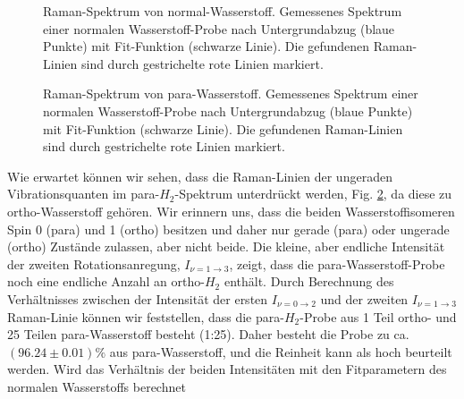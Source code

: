 \documentclass[11pt]{article}
\begin{document}
\begin{figure}[htbp]
	\centering
   \caption{\small Raman-Spektrum von normal-Wasserstoff. Gemessenes Spektrum einer normalen Wasserstoff-Probe nach Untergrundabzug (blaue Punkte) mit Fit-Funktion (schwarze Linie). Die gefundenen Raman-Linien sind durch gestrichelte rote Linien markiert.}
   \label{fig:normal_H2}
\end{figure}

\begin{figure}[htbp]
	\centering
   \caption{\small Raman-Spektrum von para-Wasserstoff. Gemessenes Spektrum einer normalen Wasserstoff-Probe nach Untergrundabzug (blaue Punkte) mit Fit-Funktion (schwarze Linie). Die gefundenen Raman-Linien sind durch gestrichelte rote Linien markiert.}
   \label{fig:para_H2}
\end{figure}

Wie erwartet können wir sehen, dass die Raman-Linien der ungeraden Vibrationsquanten im para-$H_2$-Spektrum unterdrückt werden, Fig. \ref{fig:para_H2}, da diese zu ortho-Wasserstoff gehören. Wir erinnern uns, dass die beiden Wasserstoffisomeren Spin 0 (para) und 1 (ortho) besitzen und daher nur gerade (para) oder ungerade (ortho) Zustände zulassen, aber nicht beide. Die kleine, aber endliche Intensität der zweiten Rotationsanregung, $I_{\nu  = 1 \to 3}$, zeigt, dass die para-Wasserstoff-Probe noch eine endliche Anzahl an ortho-$H_2$ enthält. Durch Berechnung des Verhältnisses zwischen der Intensität der ersten $I_{\nu  = 0 \to 2}$ und der zweiten $I_{\nu  = 1 \to 3}$ Raman-Linie können wir feststellen, dass die para-$H_2$-Probe aus 1 Teil ortho- und 25 Teilen para-Wasserstoff besteht (1:25). Daher besteht die Probe zu ca. $\left(96.24\pm0.01\right)\%$ aus para-Wasserstoff, und die Reinheit kann als hoch beurteilt werden. Wird das Verhältnis der beiden Intensitäten mit den Fitparametern des normalen Wasserstoffs berechnet
\end{document}
